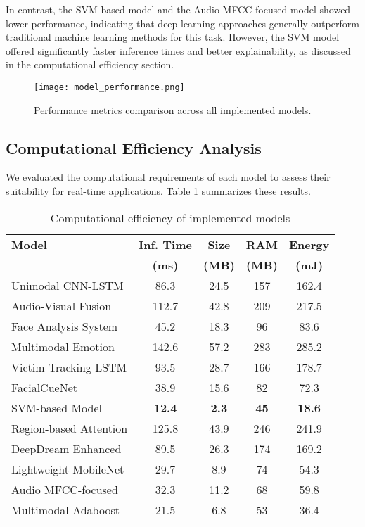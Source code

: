 \documentclass[conference,compsoc]{IEEEtran}
\begin{document}
In contrast, the SVM-based model and the Audio MFCC-focused model showed lower performance, indicating that deep learning approaches generally outperform traditional machine learning methods for this task. However, the SVM model offered significantly faster inference times and better explainability, as discussed in the computational efficiency section.

\vspace{0.5cm}
\begin{figure}[htbp]
\centering
\texttt{[image: model\_performance.png]}
\caption{Performance metrics comparison across all implemented models.}
\label{fig:model_performance}
\end{figure}
\FloatBarrier

\subsection{Computational Efficiency Analysis}
We evaluated the computational requirements of each model to assess their suitability for real-time applications. Table \ref{tab:computational_efficiency} summarizes these results.

\begin{table}[!t]
\caption{Computational efficiency of implemented models}
\label{tab:computational_efficiency}
\centering
\renewcommand{\arraystretch}{1.2}
\begin{tabularx}{\columnwidth}{>{\raggedright\arraybackslash}X cccc}
\toprule
\textbf{Model} & \textbf{Inf. Time} & \textbf{Size} & \textbf{RAM} & \textbf{Energy} \\
& \textbf{(ms)} & \textbf{(MB)} & \textbf{(MB)} & \textbf{(mJ)} \\
\midrule
Unimodal CNN-LSTM & 86.3 & 24.5 & 157 & 162.4 \\
Audio-Visual Fusion & 112.7 & 42.8 & 209 & 217.5 \\
Face Analysis System & 45.2 & 18.3 & 96 & 83.6 \\
Multimodal Emotion & 142.6 & 57.2 & 283 & 285.2 \\
Victim Tracking LSTM & 93.5 & 28.7 & 166 & 178.7 \\
FacialCueNet & 38.9 & 15.6 & 82 & 72.3 \\
SVM-based Model & \textbf{12.4} & \textbf{2.3} & \textbf{45} & \textbf{18.6} \\
Region-based Attention & 125.8 & 43.9 & 246 & 241.9 \\
DeepDream Enhanced & 89.5 & 26.3 & 174 & 169.2 \\
Lightweight MobileNet & 29.7 & 8.9 & 74 & 54.3 \\
Audio MFCC-focused & 32.3 & 11.2 & 68 & 59.8 \\
Multimodal Adaboost & 21.5 & 6.8 & 53 & 36.4 \\
\bottomrule
\end{tabularx}
\end{table}
\end{document}
